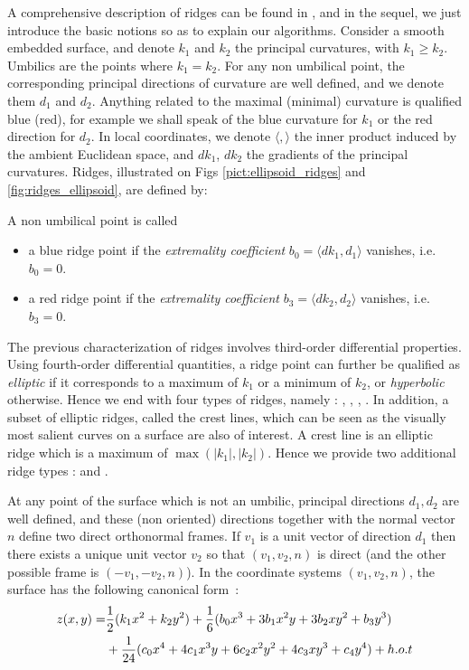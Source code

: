 A comprehensive description of ridges can be found in
\cite{cgal:hgygm-ttdpf-99,cgal:p-gd-01,cgal:cp-ssulc-05}
, and in the sequel, we just introduce the basic notions so as to
explain our algorithms.  Consider a smooth embedded surface, and
denote $k_1$ and $k_2$ the principal curvatures, with $k_1\geq
k_2$. Umbilics are the points where $k_1=k_2$.  For any non umbilical
point, the corresponding principal directions of curvature are well
defined, and we denote them $d_1$ and $d_2$.
Anything related to the maximal (minimal) curvature is qualified blue
(red), for example we shall speak of the blue curvature for $k_1$ or
the red direction for $d_2$.
In local coordinates, we denote $\langle , \rangle$
the inner product induced by the ambient Euclidean space, and $dk_1$,
$dk_2$ the gradients of the principal curvatures. Ridges, illustrated
on Figs \ref{pict:ellipsoid_ridges} and \ref{fig:ridges_ellipsoid},
are defined by:

\begin{definition}
\label{def:ridge-extrema}
A non umbilical point is called
\begin{itemize}
\item
a blue ridge point if the {\em extremality coefficient} $b_0=\langle
dk_1,d_1 \rangle$ vanishes, i.e. $b_0=0$.

\item
a red ridge point if the {\em extremality coefficient} $b_3=\langle
dk_2,d_2 \rangle$ vanishes, i.e. $b_3=0$.

\end{itemize}
\end{definition}

The previous characterization of ridges involves third-order
differential properties. Using fourth-order differential quantities, a
ridge point can further be qualified as {\em elliptic} if it
corresponds to a maximum of $k_1$ or a minimum of $k_2$, or {\em
hyperbolic} otherwise. Hence we end with four types of ridges, namely
: , , ,
.
In addition, a subset of elliptic ridges, called the crest lines,
which can be seen as the visually most salient curves on a surface are
also of interest. A crest line is an elliptic ridge which is a maximum
of $\max(|k_1|,|k_2|)$. Hence we provide two additional ridge types :
 and .



At any point of the surface which is not an umbilic, principal
directions $d_1, d_2$ are well defined, and these (non oriented)
directions together with the normal vector $n$ define two direct
orthonormal frames. If $v_1$ is a unit vector of direction $d_1$ then
there exists a unique unit vector $v_2$ so that $(v_1,v_2,n)$ is
direct (and the other possible frame is $(-v_1,-v_2,n)$). In the
coordinate systems $(v_1,v_2,n)$, the surface has the following
canonical form~:
%
\begin{eqnarray}
\label{eq:monge}
z(x,y) =  & \frac{1}{2}(k_1x^2 + k_2y^2)+
	\frac{1}{6}(b_0x^3+3b_1x^2y+3b_2xy^2+b_3y^3) \\
  &  +\frac{1}{24}(c_0x^4+4c_1x^3y+6c_2x^2y^2+4c_3xy^3+c_4y^4) + h.o.t
\end{eqnarray}

